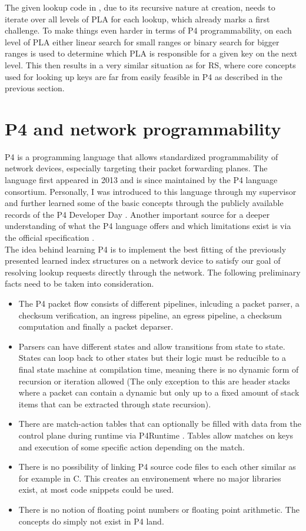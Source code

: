 The given lookup code in \cite{pgm}, due to its recursive nature at creation, needs to iterate over all levels of PLA for each lookup, which already marks a first challenge. To make things even harder in terms of P4 programmability, on each level of PLA either linear search for small ranges or binary search for bigger ranges is used to determine which PLA is responsible for a given key on the next level. This then results in a very similar situation as for RS, where core concepts used for looking up keys are far from easily feasible in P4 as described in the previous section.

\section{P4 and network programmability}
P4 is a programming language that allows standardized programmability of network devices, especially targeting their packet forwarding planes. The language first appeared in 2013 and is since maintained by the P4 language consortium. Personally, I was introduced to this language through my supervisor and further learned some of the basic concepts through the publicly available records of the P4 Developer Day \cite{p4-devday}. Another important source for a deeper understanding of what the P4 language offers and which limitations exist is via the official specification \cite{p4-spec}.\\
The idea behind learning P4 is to implement the best fitting of the previously presented learned index structures on a network device to satisfy our goal of resolving lookup requests directly through the network. The following preliminary facts need to be taken into consideration.

\begin{itemize}
  \item The P4 packet flow consists of different pipelines, inlcuding a packet parser, a checksum verification, an ingress pipeline, an egress pipeline, a checksum computation and finally a packet deparser.
  \item Parsers can have different states and allow transitions from state to state. States can loop back to other states but their logic must be reducible to a final state machine at compilation time, meaning there is no dynamic form of recursion or iteration allowed (The only exception to this are header stacks where a packet can contain a dynamic but only up to a fixed amount of stack items that can be extracted through state recursion).
  \item There are match-action tables that can optionally be filled with data from the control plane during runtime via P4Runtime \cite{p4runtime-spec}. Tables allow matches on keys and execution of some specific action depending on the match.
  \item There is no possibility of linking P4 source code files to each other similar as for example in C. This creates an environement where no major libraries exist, at most code snippets could be used.
  \item There is no notion of floating point numbers or floating point arithmetic. The concepts do simply not exist in P4 land.
\end{itemize}


